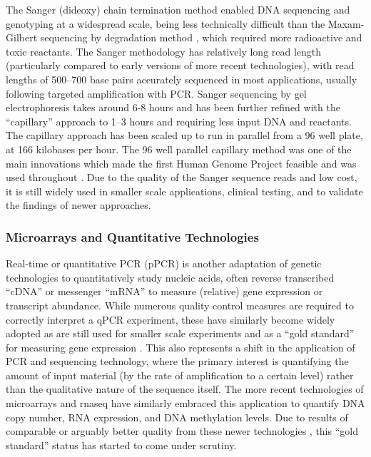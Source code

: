 The Sanger (dideoxy) chain termination method \citep{Sanger1975} enabled DNA sequencing and genotyping at a widespread scale, being less technically difficult than the Maxam-Gilbert sequencing by degradation method \citep{Gilbert1973, Maxam1977}, which required more radioactive and toxic reactants. The Sanger methodology has relatively long read length (particularly compared to early versions of more recent technologies), with read lengths of 500--700 base pairs accurately sequenced in most applications, usually following targeted amplification with PCR. Sanger sequencing by gel electrophoresis takes around 6-8 hours and has been further refined with the ``capillary'' approach to 1--3 hours and requiring less input DNA and reactants. The capillary approach has been scaled up to run in parallel from a 96 well plate, at 166 kilobases per hour. The 96 well parallel capillary method was one of the main innovations which made the first Human Genome Project feasible and was used throughout \citep{Lander2001}. Due to the quality of the Sanger sequence reads and low cost, it is still widely used in smaller scale applications, clinical testing, and to validate the findings of newer approaches.


\subsubsection{Microarrays and Quantitative Technologies}
Real-time or quantitative PCR (\gls{pPCR}) is another adaptation of genetic technologies to quantitatively study nucleic acids, often reverse transcribed ``\gls{cDNA}'' or messenger ``\gls{mRNA}'' to measure (relative) gene expression or transcript abundance. While numerous quality control measures are required to correctly interpret a qPCR experiment, these have similarly become widely adopted as are still used for smaller scale experiments and as a ``gold standard'' for measuring gene expression \citep{Adamski2014}. This also represents a shift in the application of PCR and sequencing technology, where the primary interest is quantifying the amount of input material (by the rate of amplification to a certain level) rather than the qualitative nature of the sequence itself. The more recent technologies of microarrays and \gls{rnaseq} have similarly embraced this application to quantify DNA copy number, RNA expression, and DNA methylation levels. Due to results of comparable or arguably better quality from these newer technologies \citep{Robin2016, Beck2016, McCourt2013, Git2010}, this ``gold standard'' status has started to come under scrutiny.

